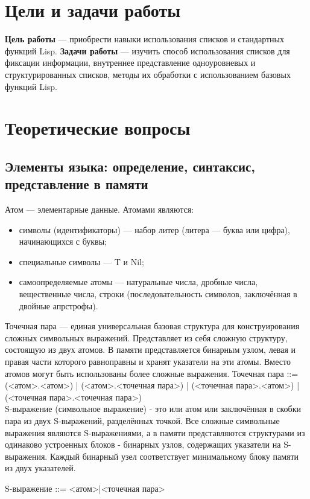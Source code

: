 \chapter{Цели и задачи работы}
\textbf{Цель работы} --- приобрести навыки использования списков и стандартных функций Lisp.
\textbf{Задачи работы} --- изучить способ использования списков для фиксации информации, внутреннее представление одноуровневых и структурированных списков, методы их обработки с использованием базовых функций Lisp.
\chapter{Теоретические вопросы}
\section{Элементы языка: определение, синтаксис, представление в памяти}
Атом --- элементарные данные. Атомами являются:
\begin{itemize}
\item символы (идентификаторы) --- набор литер (литера --- буква или цифра), начинающихся с буквы;
\item специальные символы --- T и Nil;
\item самоопределяемые атомы --- натуральные числа, дробные числа, вещественные числа, строки (последовательность символов, заключённая в двойные апрстрофы).
\end{itemize}

Точечная пара --- единая универсальная базовая структура для конструирования сложных символьных выражений. Представляет из себя сложную структуру, состоящую из двух атомов. В памяти представляется бинарным узлом, левая и правая части которого равноправны и хранят указатели на эти атомы. Вместо атомов могут быть использованы более сложные выражения.
Точечная пара ::= (<атом>.<атом>) | (<атом>.<точечная пара>) | (<точечная пара>.<атом>) | (<точечная пара>.<точечная пара>)\\

S-выражение (символьное выражение) - это или атом или заключённая в скобки пара из двух S-выражений, разделённых точкой. Все сложные символьные выражения являются S-выражениями, а в памяти представляются структурами из одинаково устроенных блоков - бинарных узлов, содержащих указатели на S-выражения. Каждый бинарный узел соответствует минимальному блоку памяти из двух указателей.

S-выражение ::= <атом>|<точечная пара>\\

